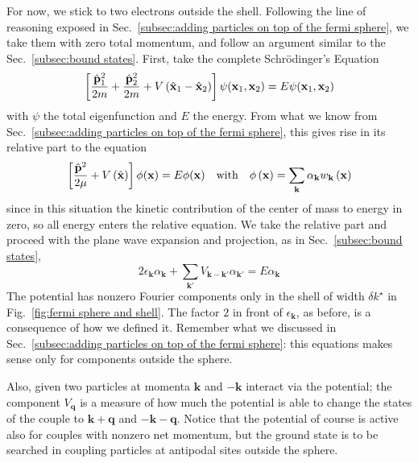 For now, we stick to two electrons outside the shell. Following the line of reasoning exposed in Sec.~\ref{subsec:adding particles on top of the fermi sphere}, we take them with zero total momentum, and follow an argument similar to the Sec.~\ref{subsec:bound states}. First, take the complete Schrödinger's Equation
\[
	\left[{\frac{\hat{\mathbf{p}}_1^2}{2m} + \frac{\hat{\mathbf{p}}_2^2}{2m} + V \left({\hat{\mathbf{x}}_1 - \hat{\mathbf{x}}_2}\right)}\right] \psi(\mathbf{x}_1,\mathbf{x}_2) = E \psi(\mathbf{x}_1,\mathbf{x}_2)
\]
with $\psi$ the total eigenfunction and $E$ the energy. From what we know from Sec.~\ref{subsec:adding particles on top of the fermi sphere}, this gives rise in its relative part to the equation
\[
	\lrS{\frac{\hat{\mathbf{p}}^2}{2\mu} + V \lrR{\hat{\mathbf{x}}}} \phi(\mathbf{x}) = E \phi(\mathbf{x})
	\qq{with}
	\phi\lrR{\mathbf{x}} = \sum_\mathbf{k} \alpha_\mathbf{k} w_\mathbf{k} \lrR{\mathbf{x}}
\]
since in this situation the kinetic contribution of the center of mass to energy in zero, so all energy enters the relative equation. We take the relative part and proceed with the plane wave expansion and projection, as in Sec.~\ref{subsec:bound states},
\begin{equation}\label{eq:energy equation single cooper pair momentum}
	2 \epsilon_\mathbf{k} \alpha_\mathbf{k} + \sum_{\mathbf{k}'} V_{\mathbf{k}-\mathbf{k}'} \alpha_{\mathbf{k}'} = E \alpha_\mathbf{k}
\end{equation}
The potential has nonzero Fourier components only in the shell of width $\delta k^\star$ in Fig.~\ref{fig:fermi sphere and shell}. The factor $2$ in front of $\epsilon_\mathbf{k}$, as before, is a consequence of how we defined it. Remember what we discussed in Sec.~\ref{subsec:adding particles on top of the fermi sphere}: this equations makes sense only for components outside the sphere.

Also, given two particles at momenta $\mathbf{k}$ and $-\mathbf{k}$ interact via the potential; the component $V_\mathbf{q}$ is a measure of how much the potential is able to change the states of the couple to $\mathbf{k}+\mathbf{q}$ and $-\mathbf{k}-\mathbf{q}$. Notice that the potential of course is active also for couples with nonzero net momentum, but the ground state is to be searched in coupling particles at antipodal sites outside the sphere.

